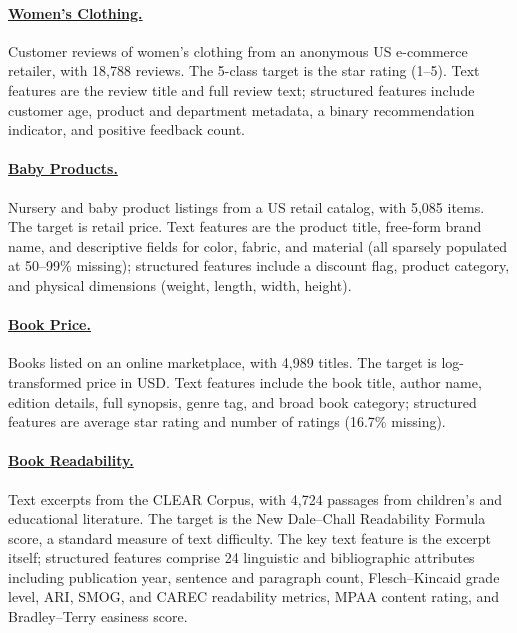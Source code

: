 \documentclass{llmxive}
\begin{document}
\paragraph{\href{https://www.openml.org/search?type=data&id=46659}{Women's Clothing.}}
Customer reviews of women's clothing from an anonymous US e-commerce retailer, with 18,788 reviews.
The 5-class target is the star rating (1--5).
Text features are the review title and full review text; structured features include customer age, product and department metadata, a binary recommendation indicator, and positive feedback count.

\paragraph{\href{http://pages.cs.wisc.edu/~anhai/data/784_data/baby_products/}{Baby Products.}}
Nursery and baby product listings from a US retail catalog, with 5,085 items.
The target is retail price.
Text features are the product title, free-form brand name, and descriptive fields for color, fabric, and material (all sparsely populated at 50--99\% missing); structured features include a discount flag, product category, and physical dimensions (weight, length, width, height).

\paragraph{\href{https://www.openml.org/search?type=data&id=46663}{Book Price.}}
Books listed on an online marketplace, with 4,989 titles.
The target is log-transformed price in USD.
Text features include the book title, author name, edition details, full synopsis, genre tag, and broad book category; structured features are average star rating and number of ratings (16.7\% missing).

\paragraph{\href{https://www.kaggle.com/datasets/verracodeguacas/clear-corpus}{Book Readability.}}
Text excerpts from the CLEAR Corpus, with 4,724 passages from children's and educational literature.
The target is the New Dale--Chall Readability Formula score, a standard measure of text difficulty.
The key text feature is the excerpt itself; structured features comprise 24 linguistic and bibliographic attributes including publication year, sentence and paragraph count, Flesch--Kincaid grade level, ARI, SMOG, and CAREC readability metrics, MPAA content rating, and Bradley--Terry easiness score.
\end{document}
